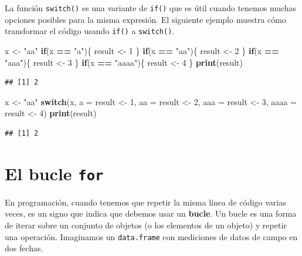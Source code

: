 \documentclass[
]{book}
\newenvironment{Shaded}{\begin{snugshade}}{\end{snugshade}}
\newcommand{\ControlFlowTok}[1]{\textcolor[rgb]{0.13,0.29,0.53}{\textbf{#1}}}
\newcommand{\DataTypeTok}[1]{\textcolor[rgb]{0.13,0.29,0.53}{#1}}
\newcommand{\DecValTok}[1]{\textcolor[rgb]{0.00,0.00,0.81}{#1}}
\newcommand{\KeywordTok}[1]{\textcolor[rgb]{0.13,0.29,0.53}{\textbf{#1}}}
\newcommand{\NormalTok}[1]{#1}
\newcommand{\OperatorTok}[1]{\textcolor[rgb]{0.81,0.36,0.00}{\textbf{#1}}}
\newcommand{\StringTok}[1]{\textcolor[rgb]{0.31,0.60,0.02}{#1}}
\begin{document}
La función \texttt{switch()} es una variante de \texttt{if()} que es útil cuando tenemos muchas opciones posibles para la misma expresión. El siguiente ejemplo muestra cómo transformar el código usando \texttt{if()} a \texttt{switch()}.

\begin{Shaded}
\begin{Highlighting}[]
\NormalTok{x <-}\StringTok{ "aa"}
\ControlFlowTok{if}\NormalTok{(x }\OperatorTok{==}\StringTok{ "a"}\NormalTok{)\{}
\NormalTok{  result <-}\StringTok{ }\DecValTok{1}
\NormalTok{\}}
\ControlFlowTok{if}\NormalTok{(x }\OperatorTok{==}\StringTok{ "aa"}\NormalTok{)\{}
\NormalTok{  result <-}\StringTok{ }\DecValTok{2}
\NormalTok{\}}
\ControlFlowTok{if}\NormalTok{(x }\OperatorTok{==}\StringTok{ "aaa"}\NormalTok{)\{}
\NormalTok{  result <-}\StringTok{ }\DecValTok{3}
\NormalTok{\}}
\ControlFlowTok{if}\NormalTok{(x }\OperatorTok{==}\StringTok{ "aaaa"}\NormalTok{)\{}
\NormalTok{  result <-}\StringTok{ }\DecValTok{4}
\NormalTok{\}}
\KeywordTok{print}\NormalTok{(result)}
\end{Highlighting}
\end{Shaded}

\begin{verbatim}
## [1] 2
\end{verbatim}

\begin{Shaded}
\begin{Highlighting}[]
\NormalTok{x <-}\StringTok{ "aa"}
\ControlFlowTok{switch}\NormalTok{(x, }
  \DataTypeTok{a =}\NormalTok{ result <-}\StringTok{ }\DecValTok{1}\NormalTok{,}
  \DataTypeTok{aa =}\NormalTok{ result <-}\StringTok{ }\DecValTok{2}\NormalTok{,}
  \DataTypeTok{aaa =}\NormalTok{ result <-}\StringTok{ }\DecValTok{3}\NormalTok{,}
  \DataTypeTok{aaaa =}\NormalTok{ result <-}\StringTok{ }\DecValTok{4}\NormalTok{)}
\KeywordTok{print}\NormalTok{(result)}
\end{Highlighting}
\end{Shaded}

\begin{verbatim}
## [1] 2
\end{verbatim}

\hypertarget{l17for}{%
\section{\texorpdfstring{El bucle \texttt{for}}{El bucle for}}\label{l17for}}

En programación, cuando tenemos que repetir la misma línea de código varias veces, es un signo que indica que debemos usar un \textbf{bucle}. Un bucle es una forma de iterar sobre un conjunto de objetos (o los elementos de un objeto) y repetir una operación. Imaginamos un \texttt{data.frame} con mediciones de datos de campo en dos fechas.
\end{document}
